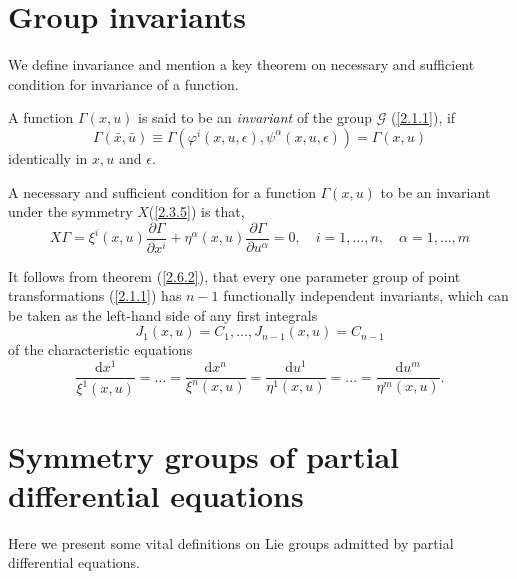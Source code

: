 \section{ Group invariants}
We define invariance and mention  a key theorem on necessary and sufficient condition for invariance of a function.
\begin{defn} A function $ \Gamma(x,u) $ is said to be an \textit{invariant }of the group  $\mathcal{G}$ (\ref{2.1.1}), if 
	\begin{equation}
	\Gamma( \bar{x},\bar{u} ) \equiv \Gamma ( \varphi^i(x,u,\epsilon), \psi^{\alpha}(x,u,\epsilon))= \Gamma(x,u) \label{2.6.1}
	\end{equation} identically in $ x, u$ and $ \epsilon$.
\end{defn}


\begin{thm} A necessary and sufficient condition for a  function $\Gamma(x,u)$ to be an invariant under the symmetry $X$(\ref{2.3.5}) is that, \begin{equation} X \Gamma = \xi^i(x,u) \frac{ \partial \Gamma  }{ \partial x^i} + \eta^{\alpha}(x,u)  \frac{ \partial \Gamma }{ \partial u^{\alpha }} =0,\quad i = 1,  \ldots, n, \quad \alpha = 1,  \ldots, m 
	\end{equation} \label{2.6.2}
\end{thm}
\begin{rem}
	It follows from theorem (\ref{2.6.2}), that every one parameter group of point transformations (\ref{2.1.1}) has $ n-1$ functionally independent invariants, which can be taken as the left-hand side of any first integrals \begin{equation}
	J_1(x,u)=C_1, \ldots, J_{n-1}(x,u) = C_{n-1} \label{2.6.3}
	\end{equation} of the characteristic equations 
	\begin{equation}\frac{ \mathrm{d}x^1}{ \xi^1(x,u)}= \ldots= \frac{ \mathrm{d}x^n}{ \xi^n(x,u)}= \frac{ \mathrm{d}u^1}{ \eta^1(x,u)}=\ldots = \frac{ \mathrm{d}u^m}{ \eta^m(x,u)}. \label{2.6.4}
	\end{equation}	
\end{rem}



\section{Symmetry groups of  partial differential equations}
Here we present some vital definitions on Lie groups admitted by partial differential equations. 

